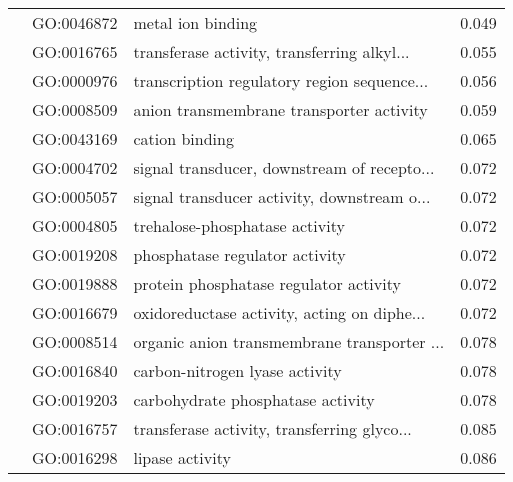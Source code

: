 \begin{longtable}{lllr}
   & GO:0046872 &                            metal ion binding &         0.049 \\
   & GO:0016765 &  transferase activity, transferring alkyl... &         0.055 \\
   & GO:0000976 &  transcription regulatory region sequence... &         0.056 \\
   & GO:0008509 &     anion transmembrane transporter activity &         0.059 \\
   & GO:0043169 &                               cation binding &         0.065 \\
   & GO:0004702 &  signal transducer, downstream of recepto... &         0.072 \\
   & GO:0005057 &  signal transducer activity, downstream o... &         0.072 \\
   & GO:0004805 &               trehalose-phosphatase activity &         0.072 \\
   & GO:0019208 &               phosphatase regulator activity &         0.072 \\
   & GO:0019888 &       protein phosphatase regulator activity &         0.072 \\
   & GO:0016679 &  oxidoreductase activity, acting on diphe... &         0.072 \\
   & GO:0008514 &  organic anion transmembrane transporter ... &         0.078 \\
   & GO:0016840 &               carbon-nitrogen lyase activity &         0.078 \\
   & GO:0019203 &            carbohydrate phosphatase activity &         0.078 \\
   & GO:0016757 &  transferase activity, transferring glyco... &         0.085 \\
   & GO:0016298 &                              lipase activity &         0.086 \\
\end{longtable}
